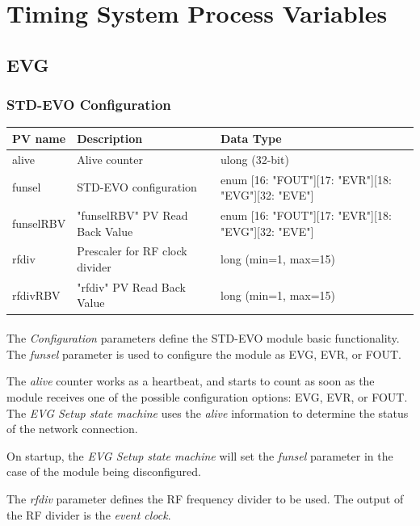 \documentclass[openany]{article}
\begin{document}
\section{Timing System Process Variables}\label{sec:process-variables}

	\subsection{EVG}

	\etoclocalframed[1]{}

		\subsubsection{STD-EVO Configuration}\label{pvgroup:evg-configuration}
			\begin{center}
			\begin{tabular}{| m{2.8cm} m{6cm} m{6cm} |}
			    \hline
			    \bfseries PV name & \bfseries Description & \bfseries Data Type \\ \hline
			    alive & Alive counter & ulong (32-bit) \\ \hline
			    funsel & STD-EVO configuration & enum [16: "FOUT"][17: "EVR"][18: "EVG"][32: "EVE"] \\ \hline
			    funselRBV & "funselRBV" PV Read Back Value & enum [16: "FOUT"][17: "EVR"][18: "EVG"][32: "EVE"] \\ \hline
			    rfdiv & Prescaler for RF clock divider & long (min=1, max=15) \\ \hline
			    rfdivRBV & "rfdiv" PV Read Back Value & long (min=1, max=15) \\ \hline
			\end{tabular}
			\end{center}

			\paragraph{} The \emph{Configuration} parameters define the STD-EVO module basic functionality. The \emph{funsel} parameter is used to configure the module as EVG, EVR, or FOUT. 
			\par The \emph{alive} counter works as a heartbeat, and starts to count as soon as the module receives one of the possible configuration options: EVG, EVR, or FOUT. The \emph{EVG Setup state machine} uses the \emph{alive} information to determine the status of the network connection.
			\par On startup, the \emph{EVG Setup state machine} will set the \emph{funsel} parameter in the case of the module being disconfigured.
			\par The \emph{rfdiv} parameter defines the RF frequency divider to be used. The output of the RF divider is the \emph{event clock}.
	
\end{document}
